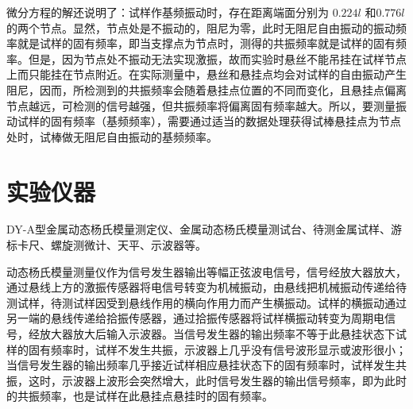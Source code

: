 \documentclass[a4paper,utf8]{article}
\begin{document}
    微分方程的解还说明了：试样作基频振动时，存在距离端面分别为 $0.224l$ 和$0.776l$的两个节点。显然，节点处是不振动的，阻尼为零，此时无阻尼自由振动的振动频率就是试样的固有频率，即当支撑点为节点时，测得的共振频率就是试样的固有频率。但是，因为节点处不振动无法实现激振，故而实验时悬丝不能吊挂在试样节点上而只能挂在节点附近。在实际测量中，悬丝和悬挂点均会对试样的自由振动产生阻尼，因而，所检测到的共振频率会随着悬挂点位置的不同而变化，且悬挂点偏离节点越远，可检测的信号越强，但共振频率将偏离固有频率越大。所以，要测量振动试样的固有频率（基频频率），需要通过适当的数据处理获得试棒悬挂点为节点处时，试棒做无阻尼自由振动的基频频率。 
\section{实验仪器}%
    DY-A型金属动态杨氏模量测定仪、金属动态杨氏模量测试台、待测金属试样、游标卡尺、螺旋测微计、天平、示波器等。 \par
    动态杨氏模量测量仪作为信号发生器输出等幅正弦波电信号，信号经放大器放大，通过悬线上方的激振传感器将电信号转变为机械振动，由悬线把机械振动传递给待测试样，待测试样因受到悬线作用的横向作用力而产生横振动。试样的横振动通过另一端的悬线传递给拾振传感器，通过拾振传感器将试样横振动转变为周期电信号，经放大器放大后输入示波器。当信号发生器的输出频率不等于此悬挂状态下试样的固有频率时，试样不发生共振，示波器上几乎没有信号波形显示或波形很小；当信号发生器的输出频率几乎接近试样相应悬挂状态下的固有频率时，试样发生共振，这时，示波器上波形会突然增大，此时信号发生器的输出信号频率，即为此时的共振频率，也是试样在此悬挂点悬挂时的固有频率。
\end{document}
